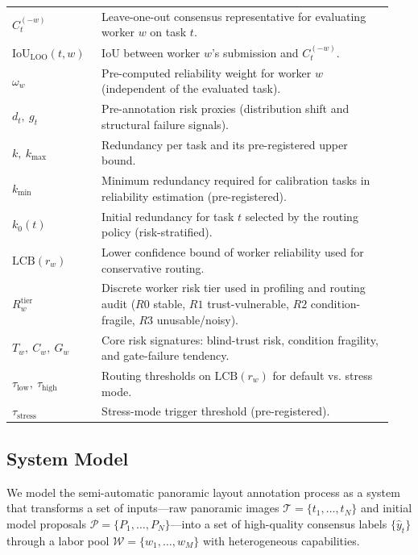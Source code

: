 \begin{longtable}{@{}p{0.22\linewidth}p{0.72\linewidth}@{}}
$C_t^{(-w)}$ & Leave-one-out consensus representative for evaluating worker $w$ on task $t$. \\
$\mathrm{IoU}_{\mathrm{LOO}}(t,w)$ & IoU between worker $w$'s submission and $C_t^{(-w)}$. \\
$\omega_w$ & Pre-computed reliability weight for worker $w$ (independent of the evaluated task). \\
$d_t,\ g_t$ & Pre-annotation risk proxies (distribution shift and structural failure signals). \\
$k,\ k_{\max}$ & Redundancy per task and its pre-registered upper bound. \\
$k_{\min}$ & Minimum redundancy required for calibration tasks in reliability estimation (pre-registered). \\
$k_0(t)$ & Initial redundancy for task $t$ selected by the routing policy (risk-stratified). \\
$\mathrm{LCB}(r_w)$ & Lower confidence bound of worker reliability used for conservative routing. \\
$R_w^{\mathrm{tier}}$ & Discrete worker risk tier used in profiling and routing audit ($R0$ stable, $R1$ trust-vulnerable, $R2$ condition-fragile, $R3$ unusable/noisy). \\
$T_w,\ C_w,\ G_w$ & Core risk signatures: blind-trust risk, condition fragility, and gate-failure tendency. \\
$\tau_{\mathrm{low}},\ \tau_{\mathrm{high}}$ & Routing thresholds on $\mathrm{LCB}(r_w)$ for default vs. stress mode. \\
$\tau_{\mathrm{stress}}$ & Stress-mode trigger threshold (pre-registered). \\
\bottomrule
\end{longtable}

\subsection{System Model}

We model the semi-automatic panoramic layout annotation process as a system that transforms a set of inputs---raw panoramic images $\mathcal{T}=\{t_1,\dots,t_N\}$ and initial model proposals $\mathcal{P}=\{P_1,\dots,P_N\}$---into a set of high-quality consensus labels $\{\hat{y}_t\}$ through a labor pool $\mathcal{W}=\{w_1,\dots,w_M\}$ with heterogeneous capabilities. 

